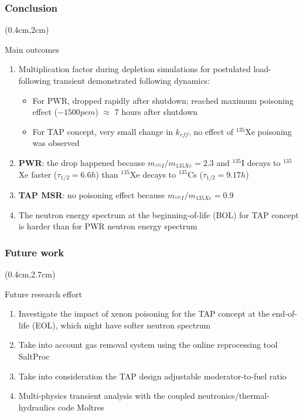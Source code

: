 \begin{frame}
\frametitle{Conclusion}
	\begin{textblock*}{12cm}(0.4cm,2cm) %
	\begin{block}{Main outcomes}
		\begin{enumerate}
			\itemsep=5mm
			\item Multiplication factor during depletion simulations for 
			postulated load-following transient demonstrated following 
			dynamics:
				\begin{itemize}
					\item For PWR, dropped rapidly after shutdown; reached 
					maximum poisoning effect ($-1500pcm$) $\approx$ 7 hours 
					after shutdown
					\item For \gls{TAP} concept, very small change in 
					$k_{eff}$, no effect of $^{135}$Xe poisoning was observed
				\end{itemize}
			\item \textbf{PWR}: the drop happened because 			
			$m_{^{135}I}/m_{{135}Xe} = 2.3$ and $^{135}$I decays to $^{135}$Xe 
			faster ($\tau_{1/2}=6.6h$) than $^{135}$Xe decays to $^{135}$Cs 
			($\tau_{1/2}=9.17h$)
			\item \textbf{\gls{TAP} \gls{MSR}}: no poisoning effect because 
			$m_{^{135}I}/m_{{135}Xe} = 0.9$
			\item The neutron energy spectrum at the beginning-of-life 
			(BOL) for \gls{TAP} concept is harder than for PWR
			neutron energy spectrum
		\end{enumerate}
	\end{block}


	\end{textblock*}
\end{frame}

\begin{frame}
\frametitle{Future work}
\begin{textblock*}{12cm}(0.4cm,2.7cm) %
	\begin{block}{Future research effort}
		\begin{enumerate}
		\itemsep=5mm
			\item Investigate the impact of xenon poisoning for the TAP 
			concept at the end-of-life (EOL), which night have softer neutron 
			spectrum
			\item Take into account gas removal system using the online 
			reprocessing tool SaltProc \cite{rykhlevskii_arfc/saltproc_2018, 
			rykhlevskii_modeling_2019}
			\item Take into consideration the \gls{TAP} design adjustable 
			moderator-to-fuel ratio
			\item Multi-physics transient analysis with the coupled 
			neutronics/thermal-hydraulics code Moltres 
			\cite{lindsay_introduction_2018}
		\end{enumerate}
	\end{block}
\end{textblock*}
\end{frame}

